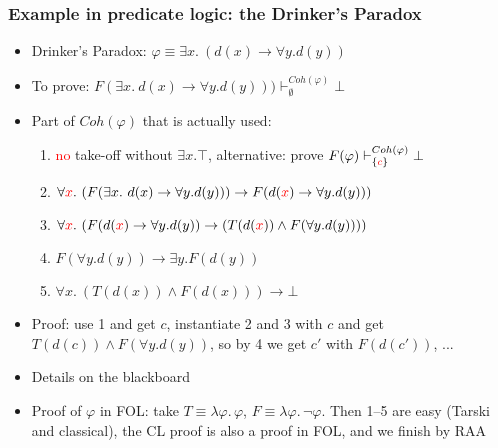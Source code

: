 \documentclass[handout,11pt]{beamer}
\newcommand{\red}[1]{\textcolor{red}{#1}}
\newcommand{\set}[1]{\{#1\}}
\newcommand{\imp}{\rightarrow}
\begin{document}
\begin{frame}
\frametitle{Example in predicate logic: the Drinker's Paradox}
 \begin{itemize}[<+->] 
    \item Drinker's Paradox: $\varphi\equiv\exists x.~(d(x)\to \forall y.d(y))$
    \item To prove: $F(\exists x.~d(x)\to \forall y.d(y))) 
    \vdash^{Coh(\varphi)}_\emptyset\bot$    
    \item Part of $Coh(\varphi)$ that is actually used:
    \begin{enumerate}[<+->]
    	\item \red{no} take-off without $\exists x. \top$, 
    	alternative: prove $F(\varphi)\vdash^{Coh(\varphi)}_{\set{\red{c}}}\bot$
    	\item $\forall\red{x}.~( F(\exists x.~d(x)\to \forall y.d(y))) \imp 
    	F(d(\red{x})\to \forall y.d(y)))$
    	\item $\forall\red{x}.~(F(d(\red{x})\to \forall y.d(y)) \imp 
    	(T(d(\red{x})) \wedge F(\forall y.d(y))))$
    	\item $F(\forall y.d(y)) \imp \exists y. F(d(y))$
    	\item $\forall x.~(T(d(x)) \wedge F(d(x))) \imp \bot$   	
    \end{enumerate}
    \item Proof: use 1 and get $c$, instantiate 2 and 3 with $c$
    and get $T(d(c)) \wedge F(\forall y.d(y))$, so by 4 we get $c'$
    with $F(d(c'))$, ...
    \item Details on the blackboard    
    \item Proof of $\varphi$ in FOL: take $T\equiv\lambda\varphi.\,\varphi$,
     $F\equiv\lambda\varphi.\,\neg\varphi$. Then 1--5 are easy
     (Tarski and classical), the CL proof is also a proof in FOL,
     and we finish by RAA
 \end{itemize}
\end{frame}
\end{document}
